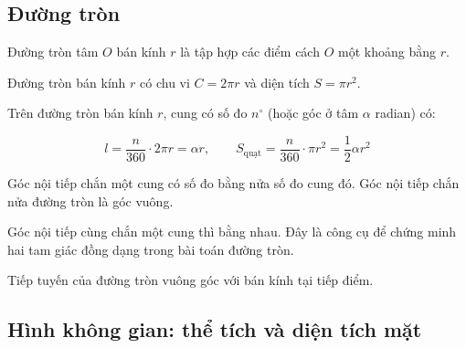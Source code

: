 \documentclass[11pt, a4paper]{article}
\begin{document}
\subsection{Đường tròn}

\begin{dinhnghia}
Đường tròn tâm $O$ bán kính $r$ là tập hợp các điểm cách $O$ một khoảng bằng $r$.
\end{dinhnghia}
\begin{dinhly}
Đường tròn bán kính $r$ có chu vi $C = 2\pi r$ và diện tích $S = \pi r^2$.
\end{dinhly}
\begin{dinhly}
Trên đường tròn bán kính $r$, cung có số đo $n^\circ$ (hoặc góc ở tâm $\alpha$ radian) có:

$$l = \frac{n}{360} \cdot 2\pi r = \alpha r, \qquad S_{\text{quạt}} = \frac{n}{360} \cdot \pi r^2 = \frac{1}{2}\alpha r^2$$
\end{dinhly}
\begin{dinhly}
Góc nội tiếp chắn một cung có số đo bằng nửa số đo cung đó. Góc nội tiếp chắn nửa đường tròn là góc vuông.

 Góc nội tiếp cùng chắn một cung thì bằng nhau. Đây là công cụ để chứng minh hai tam giác đồng dạng trong bài toán đường tròn.
\end{dinhly}
\begin{dinhly}
Tiếp tuyến của đường tròn vuông góc với bán kính tại tiếp điểm.
\end{dinhly}
\subsection{Hình không gian: thể tích và diện tích mặt}
\end{document}
